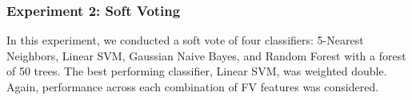 \subsubsection{Experiment 2: Soft Voting} In this experiment, we conducted a soft vote of four classifiers: 5-Nearest Neighbors, Linear SVM, Gaussian Naive Bayes, and Random Forest with a forest of 50 trees. The best performing classifier, Linear SVM, was weighted double. Again, performance across each combination of FV features was considered.








